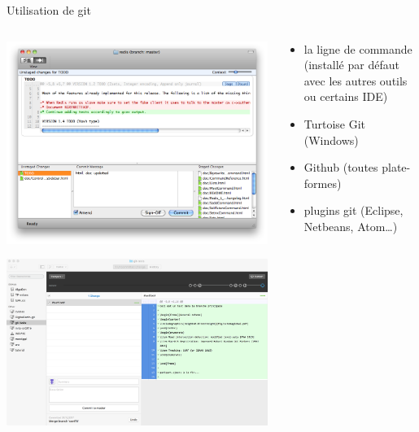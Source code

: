 \begin{frame}{%
\protect\hypertarget{utilisation-de-git}{%
Utilisation de git}}

\begin{columns}[T]
\begin{column}{0.40\textwidth}
\includegraphics[width=1\textwidth]{images/GitX-Commit.png}

\includegraphics[width=1\textwidth]{images/github.png}
\end{column}

\begin{column}{0.60\textwidth}
\begin{itemize}
\tightlist
\item
  la ligne de commande (installé par défaut avec les autres outils ou
  certains IDE)
\item
  Turtoise Git (Windows)
\item
  Github (toutes plate-formes)
\item
  plugins git (Eclipse, Netbeans, Atom\ldots{})
\end{itemize}
\end{column}
\end{columns}

\end{frame}

